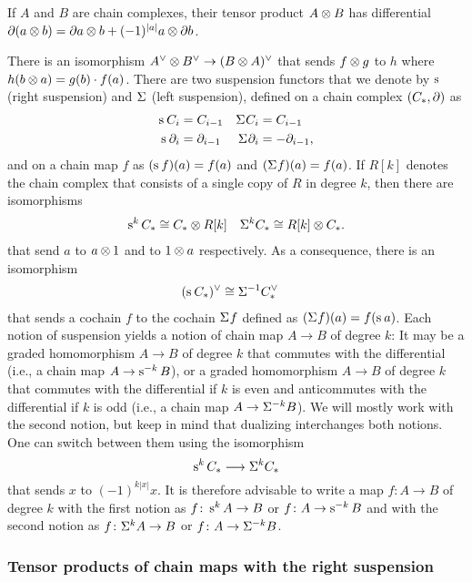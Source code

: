 \begin{convention}
	If $A$ and $B$ are chain complexes, their tensor product $A \ot B$ has differential $\partial(a \ot b) = \partial a \ot b + (-1)^{|a|}a \ot \partial b$.
\end{convention}
There is an isomorphism $A^\dd \ot B^\dd \to (B \ot A)^{\dd}$ that sends $f \ot g$ to $h$ where $h(b \ot a) = g(b)\cdot f(a)$. There are two suspension functors that we denote by $\sus{}$ (right suspension) and $\susp{}$ (left suspension), defined on a chain complex $(\ucadenas,\partial)$ as
\begin{align*}
	\sus{} \ucadenas[i] &= \ucadenas[i-1] & \susp{} \ucadenas[i] &= \ucadenas[i-1] \\
	\sus{} \partial_i &= \partial_{i-1} & \susp{} \partial_i &= -\partial_{i-1},
\end{align*}
and on a chain map $f$ as $(\sus{}f)(a) = f(a)$ and $(\susp{} f)(a) = f(a)$. If $R[k]$ denotes the chain complex that consists of a single copy of $R$ in degree $k$, then there are isomorphisms
\begin{align*}
	\sus{k} \ucadenas &\cong \ucadenas \ot R[k] & \susp{k} \ucadenas \cong R[k] \ot \ucadenas.
\end{align*}
that send $a$ to $a \ot 1$ and to $1 \ot a$ respectively. As a consequence, there is an isomorphism
\begin{align*}
	(\sus{}\ucadenas )^\dd &\cong \susp{-1}\ucocadenas
\end{align*}
that sends a cochain $f$ to the cochain $\susp{}f$ defined as $(\susp{}f)(a) = f(\sus{}a)$.
Each notion of suspension yields a notion of chain map $A \to B$ of degree $k$: It may be a graded homomorphism $A \to B$ of degree $k$ that commutes with the differential (i.e., a chain map $A \to \sus{-k} B$), or a graded homomorphism $A \to B$ of degree $k$ that commutes with the differential if $k$ is even and anticommutes with the differential if $k$ is odd (i.e., a chain map $A \to \susp{-k}B$). We will mostly work with the second notion, but keep in mind that dualizing interchanges both notions. One can switch between them using the isomorphism
\[
\sus{k}\ucadenas \lra \susp{k}\ucadenas
\]
that sends $x$ to $(-1)^{k|x|}x$. It is therefore advisable to write a map $f \colon A \to B$ of degree $k$ with the first notion as $f \colon \sus{k}A \to B$ or $f \colon A \to \sus{-k}B$ and with the second notion as $f \colon \susp{k}A \to B$ or $f \colon A \to \susp{-k}B$.

\subsubsection{Tensor products of chain maps with the right suspension}

